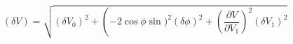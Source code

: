 \begin{equation}
\label{eq:delta_V_Malus}
\left(\delta V\right) = \sqrt{ (\delta V_0)^2 + \left(-2\cos{\phi}\sin)^2 (\delta \phi)^2 + \left( \frac{\partial{V}}{\partial{V_1}}\right)^2 (\delta V_1)^2}
\end{equation}